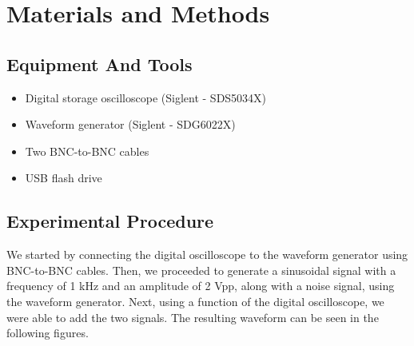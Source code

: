 \documentclass[a4paper,12pt]{article}
\begin{document}
\section{Materials and Methods}
\subsection{Equipment And Tools}
\begin{itemize}
    \item Digital storage oscilloscope (Siglent - SDS5034X)
    \item Waveform generator (Siglent - SDG6022X)
    \item Two BNC-to-BNC cables
    \item USB flash drive
\end{itemize}

\subsection{Experimental Procedure}
We started by connecting the digital oscilloscope to the waveform generator 
using BNC-to-BNC cables. Then, we proceeded to generate a sinusoidal signal 
with a frequency of 1 kHz and an amplitude of 2 Vpp, along with a noise signal, 
using the waveform generator.
Next, using a function of the digital oscilloscope, we were able to add the two signals.
The resulting waveform can be seen in the following figures. 
\end{document}
